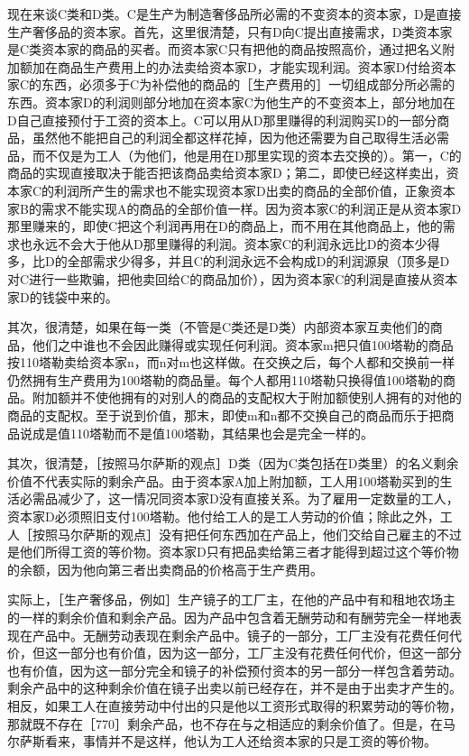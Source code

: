 现在来谈C类和D类。C是生产为制造奢侈品所必需的不变资本的资本家，D是直接生产奢侈品的资本家。首先，这里很清楚，只有D向C提出直接需求，D类资本家是C类资本家的商品的买者。而资本家C只有把他的商品按照高价，通过把名义附加额加在商品生产费用上的办法卖给资本家D，才能实现利润。资本家D付给资本家C的东西，必须多于C为补偿他的商品的［生产费用的］一切组成部分所必需的东西。资本家D的利润则部分地加在资本家C为他生产的不变资本上，部分地加在D自己直接预付于工资的资本上。C可以用从D那里赚得的利润购买D的一部分商品，虽然他不能把自己的利润全都这样花掉，因为他还需要为自己取得生活必需品，而不仅是为工人（为他们，他是用在D那里实现的资本去交换的）。第一，C的商品的实现直接取决于能否把该商品卖给资本家D；第二，即使已经这样卖出，资本家C的利润所产生的需求也不能实现资本家D出卖的商品的全部价值，正象资本家B的需求不能实现A的商品的全部价值一样。因为资本家C的利润正是从资本家D那里赚来的，即使C把这个利润再用在D的商品上，而不用在其他商品上，他的需求也永远不会大于他从D那里赚得的利润。资本家C的利润永远比D的资本少得多，比D的全部需求少得多，并且C的利润永远不会构成D的利润源泉（顶多是D对C进行一些欺骗，把他卖回给C的商品加价），因为资本家C的利润是直接从资本家D的钱袋中来的。

其次，很清楚，如果在每一类（不管是C类还是D类）内部资本家互卖他们的商品，他们之中谁也不会因此赚得或实现任何利润。资本家m把只值100塔勒的商品按110塔勒卖给资本家n，而n对m也这样做。在交换之后，每个人都和交换前一样仍然拥有生产费用为100塔勒的商品量。每个人都用110塔勒只换得值100塔勒的商品。附加额并不使他拥有的对别人的商品的支配权大于附加额使别人拥有的对他的商品的支配权。至于说到价值，那末，即使m和n都不交换自己的商品而乐于把商品说成是值110塔勒而不是值100塔勒，其结果也会是完全一样的。

其次，很清楚，［按照马尔萨斯的观点］D类（因为C类包括在D类里）的名义剩余价值不代表实际的剩余产品。由于资本家A加上附加额，工人用100塔勒买到的生活必需品减少了，这一情况同资本家D没有直接关系。为了雇用一定数量的工人，资本家D必须照旧支付100塔勒。他付给工人的是工人劳动的价值；除此之外，工人［按照马尔萨斯的观点］没有把任何东西加在产品上，他们交给自己雇主的不过是他们所得工资的等价物。资本家D只有把品卖给第三者才能得到超过这个等价物的余额，因为他向第三者出卖商品的价格高于生产费用。

实际上，［生产奢侈品，例如］生产镜子的工厂主，在他的产品中有和租地农场主的一样的剩余价值和剩余产品。因为产品中包含着无酬劳动和有酬劳完全一样地表现在产品中。无酬劳动表现在剩余产品中。镜子的一部分，工厂主没有花费任何代价，但这一部分也有价值，因为这一部分，工厂主没有花费任何代价，但这一部分也有价值，因为这一部分完全和镜子的补偿预付资本的另一部分一样包含着劳动。剩余产品中的这种剩余价值在镜子出卖以前已经存在，并不是由于出卖才产生的。相反，如果工人在直接劳动中付出的只是他以工资形式取得的积累劳动的等价物，那就既不存在［770］剩余产品，也不存在与之相适应的剩余价值了。但是，在马尔萨斯看来，事情并不是这样，他认为工人还给资本家的只是工资的等价物。

